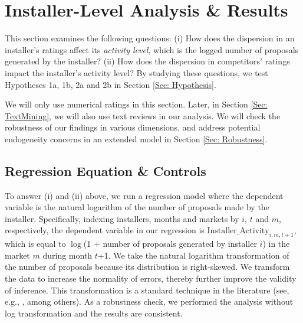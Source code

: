 \documentclass[msom,blindrev]{informs3}
\begin{document}
%




\section{Installer-Level Analysis \& Results} \label{Sec: Installer-level}

This section examines the following questions: (i) How does the dispersion in an installer's ratings affect its \emph{activity level}, which is the logged  number of proposals generated by the installer? (ii) How does the dispersion in competitors' ratings impact the installer's activity level? By studying these questions, we test Hypotheses 1a, 1b, 2a and 2b in Section \ref{Sec: Hypothesis}.


We will only use numerical ratings in this section. Later, in Section \ref{Sec: TextMining}, we will also use text reviews in our analysis. We will check the robustness of our findings in various dimensions, and address potential endogeneity concerns in an extended model in Section \ref{Sec: Robustness}.

\subsection{Regression Equation \& Controls}

 To answer (i) and (ii) above, we run a regression model where the dependent variable is the natural logarithm of the number of proposals made by the installer. Specifically, indexing installers, months and markets by $i$, $t$ and $m$, respectively, the dependent variable in our regression is  $\text{Installer\_Activity}_{i,m,t+1}$, which is equal to $\log$(1 $+$ number of proposals generated by installer $i$) in the market $m$ during month $t$+1. We take the natural logarithm transformation of the number of proposals because its distribution is right-skewed.  We transform the data to increase the normality of errors, thereby further improve the validity of inference. This transformation is a standard technique in the literature (see, e.g., \citet{song2017closing,tan2014does}, among others). As a robustness check, we performed the analysis without log transformation and the results are consistent.
\end{document}
